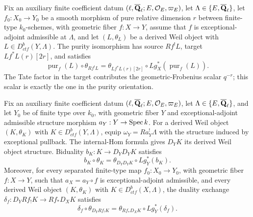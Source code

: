 
\begin{proposition}
\label{prop:weil-purity-compatibility}


Fix an auxiliary finite coefficient datum
\((\ell,\overline{\mathbf Q}_\ell;E,\mathcal O_E,\varpi_E)\), let \(\Lambda\in\{E,\overline{\mathbf Q}_\ell\}\),
let \(f_0:X_0\to Y_0\) be a smooth morphism of pure relative dimension
\(r\) between finite-type \(k_0\)-schemes, with
geometric fiber \(f:X\to Y\), assume that \(f\) is
exceptional-adjoint admissible at \(\Lambda\), and let
\((L,\theta_L)\) be a derived Weil
object with \(L\in D^b_{ctf}(Y,\Lambda)\).  The purity isomorphism
has source \(Rf^!L\), target \(Lf^*L(r)[2r]\), and satisfies
\[
 \operatorname{pur}_f(L)\circ\theta_{Rf^!L}
 =\theta_{Lf^*L(r)[2r]}\circ Lg_X^*(\operatorname{pur}_f(L)).
\]
The Tate factor in the target contributes the geometric-Frobenius scalar
\(q^{-r}\); this scalar is exactly the one in the purity orientation.
\end{proposition}


\begin{proposition}
\label{prop:weil-duality-compatibility}


Fix an auxiliary finite coefficient datum
\((\ell,\overline{\mathbf Q}_\ell;E,\mathcal O_E,\varpi_E)\), let \(\Lambda\in\{E,\overline{\mathbf Q}_\ell\}\),
and let \(Y_0\) be of finite type over \(k_0\), with geometric fiber
\(Y\) and exceptional-adjoint admissible structure morphism
\(a_Y:Y\to\operatorname{Spec} k\).  For a derived Weil object
\((K,\theta_K)\) with \(K\in D^b_{ctf}(Y,\Lambda)\), equip
\(\omega_Y=Ra_Y^!\Lambda\) with the structure induced by exceptional
pullback.  The internal-Hom formula gives \(D_YK\) its derived Weil object
structure.  Biduality \(b_K:K\to D_YD_YK\) satisfies
\[
 b_K\circ\theta_K
 =\theta_{D_YD_YK}\circ Lg_Y^*(b_K).
\]
Moreover, for every separated finite-type map \(f_0:X_0\to Y_0\), with
geometric fiber \(f:X\to Y\), such that \(a_X=a_Y\circ f\) is
exceptional-adjoint admissible, and every derived Weil object
\((K,\theta_K)\) with \(K\in D^b_{ctf}(X,\Lambda)\), the duality exchange
\(\delta_f:D_YRf_!K\to Rf_*D_XK\) satisfies
\[
 \delta_f\circ\theta_{D_YRf_!K}
 =\theta_{Rf_*D_XK}\circ Lg_Y^*(\delta_f).
\]
\end{proposition}

